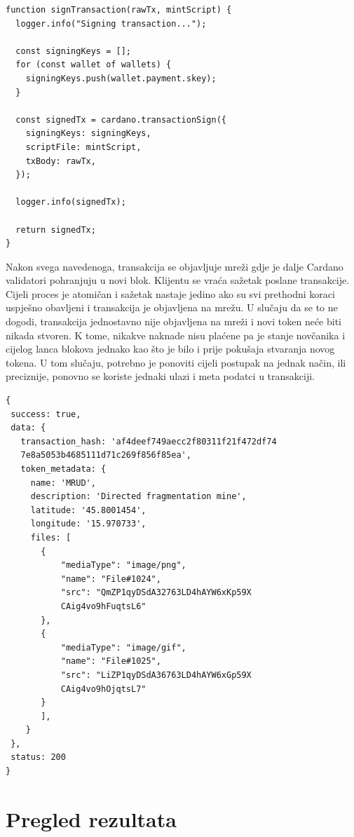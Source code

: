 \documentclass[times, utf8, diplomski]{fer}
\begin{document}
\begin{lstlisting}
function signTransaction(rawTx, mintScript) {
  logger.info("Signing transaction...");

  const signingKeys = [];
  for (const wallet of wallets) {
    signingKeys.push(wallet.payment.skey);
  }

  const signedTx = cardano.transactionSign({
    signingKeys: signingKeys,
    scriptFile: mintScript,
    txBody: rawTx,
  });

  logger.info(signedTx);

  return signedTx;
}
\end{lstlisting}

Nakon svega navedenoga, transakcija se objavljuje mreži gdje je dalje Cardano validatori pohranjuju u novi blok. Klijentu se vraća sažetak poslane transakcije. Cijeli proces je atomičan i sažetak nastaje jedino ako su svi prethodni koraci uspješno obavljeni i transakcija je objavljena na mrežu. U slučaju da se to ne dogodi, transakcija jednostavno nije objavljena na mreži i novi token neće biti nikada stvoren. K tome, nikakve naknade nisu plaćene pa je stanje novčanika i cijelog lanca blokova jednako kao što je bilo i prije pokušaja stvaranja novog tokena. U tom slučaju, potrebno je ponoviti cijeli postupak na jednak način, ili preciznije, ponovno se koriste jednaki ulazi i meta podatci u transakciji.

\begin{lstlisting}
{
 success: true,
 data: {
   transaction_hash: 'af4deef749aecc2f80311f21f472df74
   7e8a5053b4685111d71c269f856f85ea',
   token_metadata: {
     name: 'MRUD',
     description: 'Directed fragmentation mine',
     latitude: '45.8001454',
     longitude: '15.970733',
     files: [
       {
           "mediaType": "image/png",
           "name": "File#1024",
           "src": "QmZP1qyDSdA32763LD4hAYW6xKp59X
           CAig4vo9hFuqtsL6"
       },
       {
           "mediaType": "image/gif",
           "name": "File#1025",
           "src": "LiZP1qyDSdA36763LD4hAYW6xGp59X
           CAig4vo9hOjqtsL7"
       }
       ],
    }
 },
 status: 200
}

\end{lstlisting}

\section{Pregled rezultata}
\end{document}
